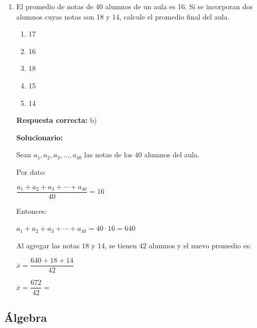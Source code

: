 \begin{enumerate}
	Hay $500$ personas.
	
	Cantidad de obreros:
	
	$70\%\,(500)=350$
	
	Cantidad de obreros despedidos:
	
	$20\%\,(350)=70$
	
	Cantidad de obreros que quedan:
	
	$350-70=280$
	
	Cantidad de obreros contratados:
	
	$30\%\,(280)=84$
	
	Cantidad de obreros que trabajan al final:
	
	
	\vspace{6mm}
	
	\item El promedio de notas de 40 alumnos de un aula es 16. Si se incorporan dos alumnos cuyas notas son 18 y 14, calcule el promedio final del aula.
	\begin{enumerate}[label=\alph*)]
		\item 17
		\item 16
		\item 18
		\item 15
		\item 14
	\end{enumerate}
	\textbf{Respuesta correcta:} b)
	
	\vspace{2mm}
\textbf{Solucionario:}

Sean $a_1,a_2,a_3,\ldots,a_{40}$ las notas de los $40$ alumnos del aula.

Por dato:

$\dfrac{a_1+a_2+a_3+\cdots+a_{40}}{40}=16$

Entonces:

$a_1+a_2+a_3+\cdots+a_{40}=40\cdot 16=640$

Al agregar las notas $18$ y $14$, se tienen $42$ alumnos y el nuevo promedio es:

$\overline{x}=\dfrac{640+18+14}{42}$

$\overline{x}=\dfrac{672}{42}=$ 
	
	\vspace{6mm}
	
\end{enumerate}

\subsection*{Álgebra}

